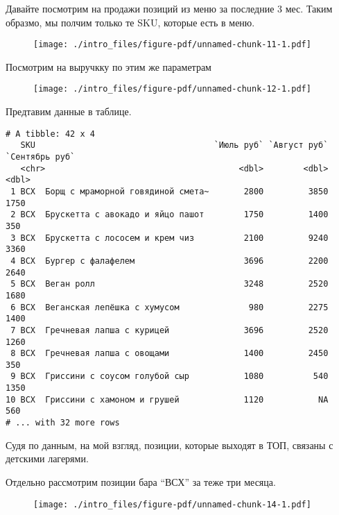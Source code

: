 \documentclass[
  letterpaper,
  DIV=11,
  numbers=noendperiod]{scrreport}
\begin{document}
Давайте посмотрим на продажи позиций из меню за последние 3 мес. Таким
образмо, мы полчим только те SKU, которые есть в меню.

\begin{figure}

{\centering \texttt{[image: ./intro\_files/figure-pdf/unnamed-chunk-11-1.pdf]}

}

\end{figure}

Посмотрим на выручкку по этим же параметрам

\begin{figure}

{\centering \texttt{[image: ./intro\_files/figure-pdf/unnamed-chunk-12-1.pdf]}

}

\end{figure}

Предтавим данные в таблице.

\begin{verbatim}
# A tibble: 42 x 4
   SKU                                    `Июль руб` `Август руб` `Сентябрь руб`
   <chr>                                       <dbl>        <dbl>          <dbl>
 1 ВСХ  Борщ с мраморной говядиной смета~       2800         3850           1750
 2 ВСХ  Брускетта с авокадо и яйцо пашот        1750         1400            350
 3 ВСХ  Брускетта с лососем и крем чиз          2100         9240           3360
 4 ВСХ  Бургер с фалафелем                      3696         2200           2640
 5 ВСХ  Веган ролл                              3248         2520           1680
 6 ВСХ  Веганская лепёшка с хумусом              980         2275           1400
 7 ВСХ  Гречневая лапша с курицей               3696         2520           1260
 8 ВСХ  Гречневая лапша с овощами               1400         2450            350
 9 ВСХ  Гриссини с соусом голубой сыр           1080          540           1350
10 ВСХ  Гриссини с хамоном и грушей             1120           NA            560
# ... with 32 more rows
\end{verbatim}

Судя по данным, на мой взгляд, позиции, которые выходят в ТОП, связаны с
детскими лагерями.

Отдельно рассмотрим позиции бара ``ВСХ'' за теже три месяца.

\begin{figure}

{\centering \texttt{[image: ./intro\_files/figure-pdf/unnamed-chunk-14-1.pdf]}

}

\end{figure}
\end{document}

